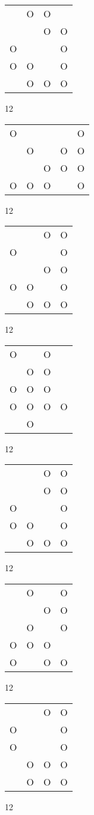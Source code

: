 \begin{tabular}{|m{0.2cm}m{0.2cm}m{0.2cm}m{0.2cm}|}\hline
 &O&O& \\
 & &O&O\\
O& & &O\\
O&O& &O\\
 &O&O&O\\
\hline\end{tabular}12
\begin{tabular}{|m{0.2cm}m{0.2cm}m{0.2cm}m{0.2cm}m{0.2cm}|}\hline
O& & & &O\\
 &O& &O&O\\
 & &O&O&O\\
O&O&O& &O\\
\hline\end{tabular}12
\begin{tabular}{|m{0.2cm}m{0.2cm}m{0.2cm}m{0.2cm}|}\hline
 & &O&O\\
O& & &O\\
 & &O&O\\
O&O& &O\\
 &O&O&O\\
\hline\end{tabular}12
\begin{tabular}{|m{0.2cm}m{0.2cm}m{0.2cm}m{0.2cm}|}\hline
O& &O& \\
 &O&O& \\
O&O&O& \\
O&O&O&O\\
 &O& & \\
\hline\end{tabular}12
\begin{tabular}{|m{0.2cm}m{0.2cm}m{0.2cm}m{0.2cm}|}\hline
 & &O&O\\
 & &O&O\\
O& & &O\\
O&O& &O\\
 &O&O&O\\
\hline\end{tabular}12
\begin{tabular}{|m{0.2cm}m{0.2cm}m{0.2cm}m{0.2cm}|}\hline
 &O& &O\\
 & &O&O\\
 &O& &O\\
O&O&O& \\
O& &O&O\\
\hline\end{tabular}12
\begin{tabular}{|m{0.2cm}m{0.2cm}m{0.2cm}m{0.2cm}|}\hline
 & &O&O\\
O& & &O\\
O& & &O\\
 &O&O&O\\
 &O&O&O\\
\hline\end{tabular}12

